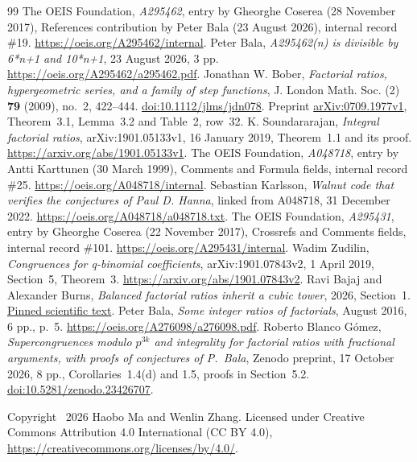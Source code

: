 \documentclass[11pt]{article}
\begin{document}
\begin{thebibliography}{99}
 The OEIS Foundation, \emph{A295462}, entry by Gheorghe
Coserea (28 November 2017), References contribution by Peter Bala
(23 August 2026), internal record \#19.
\url{https://oeis.org/A295462/internal}.
 Peter Bala, \emph{A295462(n) is divisible by 6*n+1 and
10*n+1}, 23 August 2026, 3 pp.
\url{https://oeis.org/A295462/a295462.pdf}.
 Jonathan W. Bober, \emph{Factorial ratios, hypergeometric
series, and a family of step functions}, J. London Math. Soc. (2)
\textbf{79} (2009), no.~2, 422--444.
\href{https://doi.org/10.1112/jlms/jdn078}{doi:10.1112/jlms/jdn078}.
Preprint \href{https://arxiv.org/abs/0709.1977v1}{arXiv:0709.1977v1},
Theorem~3.1, Lemma~3.2 and Table~2, row~32.
 K. Soundararajan, \emph{Integral factorial ratios},
arXiv:1901.05133v1, 16 January 2019, Theorem~1.1 and its proof.
\url{https://arxiv.org/abs/1901.05133v1}.
 The OEIS Foundation, \emph{A048718}, entry by Antti
Karttunen (30 March 1999), Comments and Formula fields, internal record
\#25. \url{https://oeis.org/A048718/internal}.
 Sebastian Karlsson, \emph{Walnut code that verifies the
conjectures of Paul D. Hanna}, linked from A048718, 31 December 2022.
\url{https://oeis.org/A048718/a048718.txt}.
 The OEIS Foundation, \emph{A295431}, entry by Gheorghe
Coserea (22 November 2017), Crossrefs and Comments fields, internal record
\#101. \url{https://oeis.org/A295431/internal}.
 Wadim Zudilin, \emph{Congruences for q-binomial
coefficients}, arXiv:1901.07843v2, 1 April 2019, Section~5, Theorem~3.
\url{https://arxiv.org/abs/1901.07843v2}.
 Ravi Bajaj and Alexander Burns, \emph{Balanced factorial
ratios inherit a cubic tower}, 2026, Section~1.
\href{https://github.com/rbajaj5/a183068-supercongruence/blob/d819eb8e8e70fdd386978adc4cbbdb2033466d40/related-results/BalancedFactorialRatioCubicTowers.md}{Pinned scientific text}.
 Peter Bala, \emph{Some integer ratios of factorials},
August 2016, 6 pp., p.~5.
\url{https://oeis.org/A276098/a276098.pdf}.
 Roberto Blanco G\'omez, \emph{Supercongruences modulo
$p^{3k}$ and integrality for factorial ratios with fractional arguments,
with proofs of conjectures of P.~Bala}, Zenodo preprint, 17 October 2026,
8 pp., Corollaries~1.4(d) and 1.5, proofs in Section~5.2.
\href{https://doi.org/10.5281/zenodo.23426707}{doi:10.5281/zenodo.23426707}.
\end{thebibliography}
\noindent\small Copyright \textcopyright\ 2026 Haobo Ma and Wenlin Zhang.
Licensed under Creative Commons Attribution 4.0 International
(CC BY 4.0), \url{https://creativecommons.org/licenses/by/4.0/}.
\end{document}
